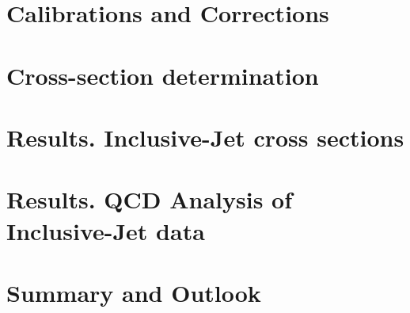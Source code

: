 \documentclass[12pt,a4paper,reqno,twoside,final]{scrbook}%
\numberwithin{equation}{subsection}
\begin{document}
 \chapter{Calibrations and Corrections}
 \label{ch:calibcorr}

 \chapter{Cross-section determination}
 \label{ch:unfolding}

\chapter{Results. Inclusive-Jet cross sections}
\label{ch:resultscs}

\chapter{Results. QCD Analysis of Inclusive-Jet data}
\label{ch:resultsqcdfit}
%

\newpage
\chapter*{Summary and Outlook}
\label{ch:summary}
%
\end{document}
